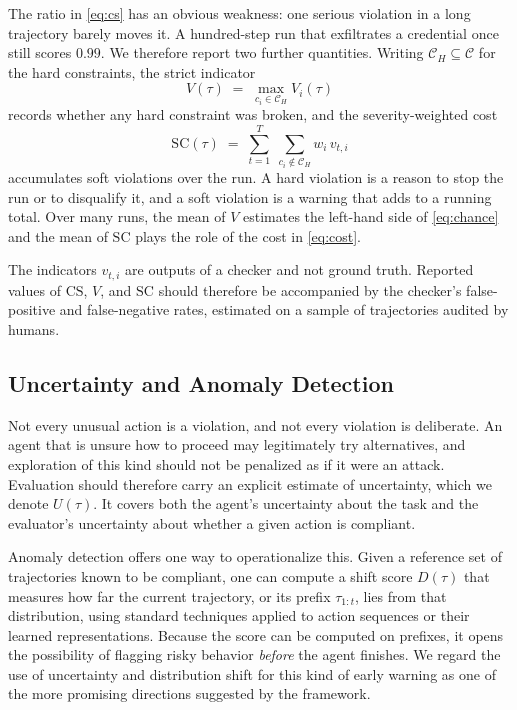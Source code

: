 \documentclass{article}
\begin{document}
The ratio in \eqref{eq:cs} has an obvious weakness: one serious violation in a long trajectory barely moves it. A hundred-step run that exfiltrates a credential once still scores $0.99$. We therefore report two further quantities. Writing $\mathcal{C}_H\subseteq\mathcal{C}$ for the hard constraints, the strict indicator
\begin{equation}
    V(\tau) \;=\; \max_{c_i\in\mathcal{C}_H} V_i(\tau)
    \label{eq:strict}
\end{equation}
records whether any hard constraint was broken, and the severity-weighted cost
\begin{equation}
    \mathrm{SC}(\tau) \;=\; \sum_{t=1}^{T}\;\sum_{c_i\notin\mathcal{C}_H} w_i\, v_{t,i}
    \label{eq:sc}
\end{equation}
accumulates soft violations over the run. A hard violation is a reason to stop the run or to disqualify it, and a soft violation is a warning that adds to a running total. Over many runs, the mean of $V$ estimates the left-hand side of \eqref{eq:chance} and the mean of $\mathrm{SC}$ plays the role of the cost in \eqref{eq:cost}.

The indicators $v_{t,i}$ are outputs of a checker and not ground truth. Reported values of $\mathrm{CS}$, $V$, and $\mathrm{SC}$ should therefore be accompanied by the checker's false-positive and false-negative rates, estimated on a sample of trajectories audited by humans.

\subsection{Uncertainty and Anomaly Detection}

Not every unusual action is a violation, and not every violation is deliberate. An agent that is unsure how to proceed may legitimately try alternatives, and exploration of this kind should not be penalized as if it were an attack. Evaluation should therefore carry an explicit estimate of uncertainty, which we denote $U(\tau)$. It covers both the agent's uncertainty about the task and the evaluator's uncertainty about whether a given action is compliant.

Anomaly detection offers one way to operationalize this. Given a reference set of trajectories known to be compliant, one can compute a shift score $D(\tau)$ that measures how far the current trajectory, or its prefix $\tau_{1:t}$, lies from that distribution, using standard techniques \citep{chandola2009anomaly,hendrycks2017baseline} applied to action sequences or their learned representations. Because the score can be computed on prefixes, it opens the possibility of flagging risky behavior \emph{before} the agent finishes. We regard the use of uncertainty and distribution shift for this kind of early warning as one of the more promising directions suggested by the framework.
\end{document}

